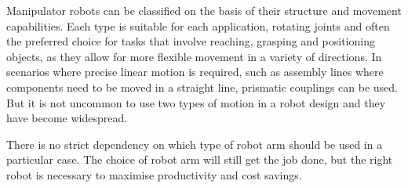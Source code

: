 Manipulator robots can be classified on the basis of their structure and movement capabilities. Each type is suitable for each application, rotating joints and often the preferred choice for tasks that involve reaching, grasping and positioning objects, as they allow for more flexible movement in a variety of directions. In scenarios where precise linear motion is required, such as assembly lines where components need to be moved in a straight line, prismatic couplings can be used. But it is not uncommon to use two types of motion in a robot design and they have become widespread.

There is no strict dependency on which type of robot arm should be used in a particular case. The choice of robot arm will still get the job done, but the right robot is necessary to maximise productivity and cost savings.

